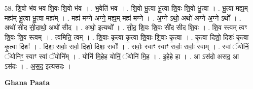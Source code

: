 \documentclass[17pt]{extarticle}
\begin{document}
58. शि॒वो भ॑व भव शि॒वः शि॒वो भ॑व । . भ॒वेति॑ भव । . शि॒वो भू॒त्वा भू॒त्वा शि॒वः शि॒वो भू॒त्वा । . भू॒त्वा मह्य॒म् मह्य॑म् भू॒त्वा भू॒त्वा मह्य᳚म् । . मह्य॑ मग्ने अग्ने॒ मह्य॒म् मह्य॑ मग्ने । . अ॒ग्ने ऽथो॒ अथो॑ अग्ने अ॒ग्ने ऽथो᳚ । . अथो॑ सीद सी॒दाथो॒ अथो॑ सीद । . अथो॒ इत्यथो᳚ । . सी॒द॒ शि॒वः शि॒वः सी॑द सीद शि॒वः । . शि॒व स्त्वम् त्वꣳ शि॒वः शि॒व स्त्वम् । . त्वमिति॒ त्वम् । . शि॒वाः कृ॒त्वा कृ॒त्वा शि॒वाः शि॒वाः कृ॒त्वा । . कृ॒त्वा दिशो॒ दिशः॑ कृ॒त्वा कृ॒त्वा दिशः॑ । . दिशः॒ सर्वाः॒ सर्वा॒ दिशो॒ दिशः॒ सर्वाः᳚ । . सर्वाः॒ स्वाꣳ स्वाꣳ सर्वाः॒ सर्वाः॒ स्वाम् । . स्वां ॅयोनिं॒ ॅयोनिꣳ॒॒ स्वाꣳ स्वां ॅयोनि᳚म् । . योनि॑ मि॒हेह योनिं॒ ॅयोनि॑ मि॒ह । . इ॒हेहे हा । . आ ऽस॑दो असद॒ आ ऽस॑दः । . अ॒स॒द॒ इत्य॑सदः । \newline

\textbf{Ghana Paata } \newline
\end{document}
